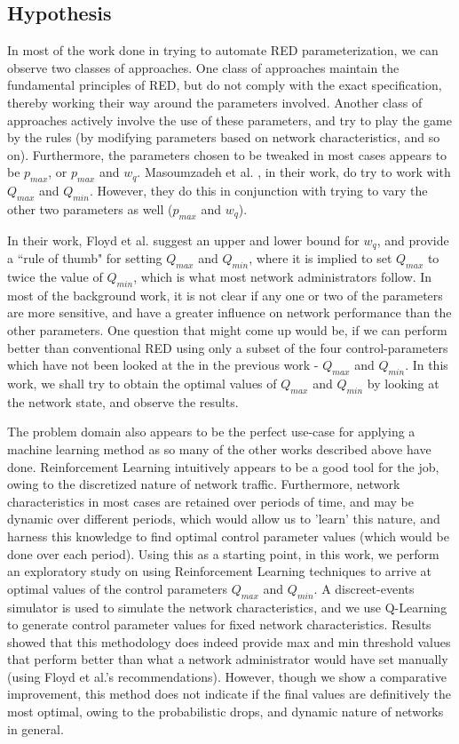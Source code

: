 \documentclass[conference, 10pt]{IEEEtran}
\begin{document}
\subsection{Hypothesis}
\label{sec:intro:hypothesis}

In most of the work done in trying to automate RED parameterization, we can observe two classes of approaches. One class of approaches maintain the fundamental principles of RED, but do not comply with the exact specification, thereby working their way around the parameters involved. Another class of approaches actively involve the use of these parameters, and try to play the game by the rules (by modifying parameters based on network characteristics, and so on). Furthermore, the parameters chosen to be tweaked in most cases appears to be $p_{max}$, or $p_{max}$ and $w_q$. Masoumzadeh et al. \cite{masoumzadeh2011fql}, in their work, do try to work with $Q_{max}$ and $Q_{min}$. However, they do this in conjunction with trying to vary the other two parameters as well ($p_{max}$ and $w_q$). 

In their work, Floyd et al. \cite{floyd1993random} suggest an upper and lower bound for $w_q$, and provide a ``rule of thumb" for setting $Q_{max}$ and $Q_{min}$, where it is implied to set $Q_{max}$ to twice the value of $Q_{min}$, which is what most network administrators follow. In most of the background work, it is not clear if any one or two of the parameters are more sensitive, and have a greater influence on network performance than the other parameters. One question that might come up would be, if we can perform better than conventional RED using only a subset of the four control-parameters which have not been looked at the in the previous work - $Q_{max}$ and $Q_{min}$. In this work, we shall try to obtain the optimal values of $Q_{max}$ and $Q_{min}$ by looking at the network state, and observe the results. 

The problem domain also appears to be the perfect use-case for applying a machine learning method as so many of the other works described above have done. Reinforcement Learning intuitively appears to be a good tool for the job, owing to the discretized nature of network traffic. Furthermore, network characteristics in most cases are retained over periods of time, and may be dynamic over different periods, which would allow us to 'learn' this nature, and harness this knowledge to find optimal control parameter values (which would be done over each period). Using this as a starting point, in this work, we perform an exploratory study on using Reinforcement Learning techniques to arrive at optimal values of the control parameters $Q_{max}$ and $Q_{min}$. A discreet-events simulator is used to simulate the network characteristics, and we use Q-Learning to generate control parameter values for fixed network characteristics. Results showed that this methodology does indeed provide max and min threshold values that perform better than what a network administrator would have set manually (using Floyd et al.'s recommendations). However, though we show a comparative improvement, this method does not indicate if the final values are definitively the most optimal, owing to the probabilistic drops, and dynamic nature of networks in general.    
\end{document}
